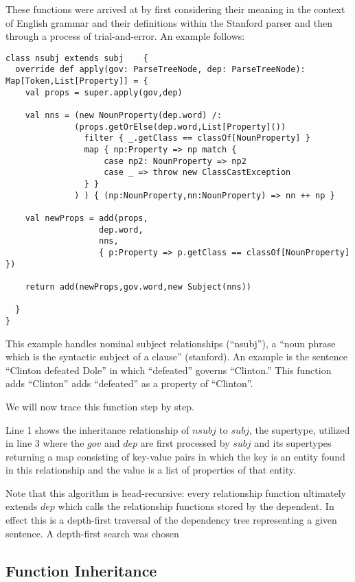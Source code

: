 \documentclass[11pt]{article}
\begin{document}
These functions were arrived at by first considering their meaning in the context of English grammar and their definitions within the Stanford parser and then through a process of trial-and-error.  An example follows: 

\begin{lstlisting}
class nsubj extends subj	{
  override def apply(gov: ParseTreeNode, dep: ParseTreeNode): Map[Token,List[Property]] = {
    val props = super.apply(gov,dep)

    val nns = (new NounProperty(dep.word) /: 
              (props.getOrElse(dep.word,List[Property]()) 
                filter { _.getClass == classOf[NounProperty] } 
                map { np:Property => np match { 
                    case np2: NounProperty => np2 
                    case _ => throw new ClassCastException 
                } } 
              ) ) { (np:NounProperty,nn:NounProperty) => nn ++ np }

    val newProps = add(props,
                   dep.word,
                   nns,
                   { p:Property => p.getClass == classOf[NounProperty] })
                   
    return add(newProps,gov.word,new Subject(nns))

  }
}
\end{lstlisting}

This example handles nominal subject relationships (``nsubj''), a ``noun phrase which is the syntactic subject of a clause'' (stanford).  An example is the sentence ``Clinton defeated Dole'' in which ``defeated'' governs ``Clinton.''  This function adds ``Clinton'' adds ``defeated'' as a property of ``Clinton''.  

We will now trace this function step by step.

Line 1 shows the inheritance relationship of $nsubj$ to $subj$, the supertype, utilized in line 3 where the $gov$ and $dep$ are first processed by $subj$ and its supertypes returning a map consisting of key-value pairs in which the key is an entity found in this relationship and the value is a list of properties of that entity.  

Note that this algorithm is head-recursive: every relationship function ultimately extends $dep$ which calls the relationship functions stored by the dependent.  In effect this is a depth-first traversal of the dependency tree representing a given sentence.  A depth-first search was chosen 

\subsection{Function Inheritance}
\end{document}
